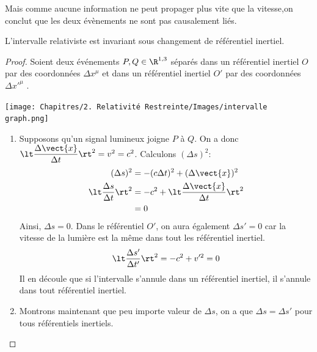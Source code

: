 Mais comme aucune information ne peut propager plus vite que la vitesse,on conclut que les deux évènements ne sont pas causalement liés. 

\begin{theoremframe}
    \begin{propri}
        L'intervalle relativiste est invariant sous changement de référentiel inertiel.
    \end{propri}
\end{theoremframe}
\begin{proof}
Soient deux événements $P,Q \in \R^{1,3}$ séparés dans un référentiel inertiel $O$ par des coordonnées $\Delta x^{\mu}$ et dans un référentiel inertiel $O'$ par des coordonnées $\Delta x'^{\mu}$ .

    \begin{center}
        \texttt{[image: Chapitres/2. Relativité Restreinte/Images/intervalle graph.png]}
    \end{center}
    \begin{enumerate}
        \item Supposons qu'un signal lumineux joigne $P$ à $Q$. On a donc $\lt \dfrac{\Delta \vect{x}}{\Delta t} \rt^2 = v^2 = c^2$. Calculons $(\Delta s )^2$:
        \begin{align}
            (\Delta s )^2  & = -(c\Delta t)^2 + (\Delta \vect{x})^2\\
            \lt\frac{\Delta s}{\Delta t}\rt^2 & = -c^2 + \lt \frac{\Delta \vect{x}}{\Delta t} \rt^2\\
            & =0
        \end{align}
        Ainsi, $\Delta s = 0$. Dans le référentiel $O'$, on aura également $\Delta s' = 0$  car la vitesse de la lumière est la même dans tout les référentiel inertiel.
        \begin{equation}
            \lt \frac{\Delta s'}{\Delta t'} \rt^2 = -c^2 + v'^2 = 0
        \end{equation}
        Il en découle que si l'intervalle s'annule dans un référentiel inertiel, il s'annule dans tout référentiel inertiel. \\
        \item Montrons maintenant que peu importe valeur de $\Delta s$, on a que $\Delta s = \Delta s' $ pour tous référentiels inertiels.


\end{enumerate}
\end{proof}
